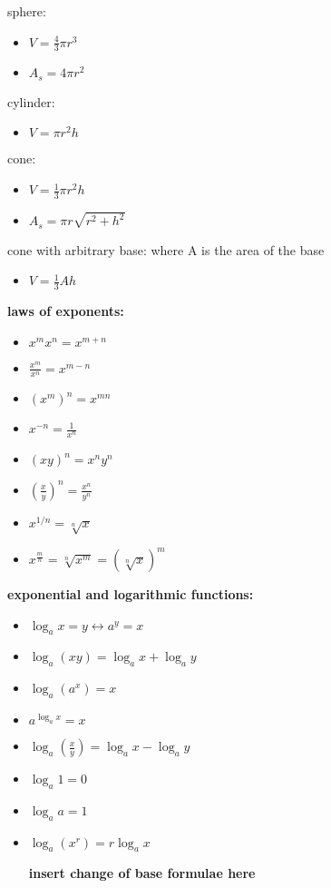 \documentclass{article}
\begin{document}
	sphere:
		\begin{itemize}
			\item $V = \frac{4}{3}\pi r^3$
			\item $A_s = 4\pi r^2$
		\end{itemize}

	cylinder:
		\begin{itemize}
			\item $V = \pi r^2h$
		\end{itemize}

	cone:
		\begin{itemize}
			\item $V = \frac{1}{3}\pi r^2h$
			\item $A_s = \pi r\sqrt{r^2+h^2}$
		\end{itemize}

	cone with arbitrary base: where A is the area of the base
		\begin{itemize}
			\item $V = \frac{1}{3}Ah$
		\end{itemize}

\textbf{laws of exponents:} 
	\begin{itemize}
		\item $x^mx^n = x^{m+n}$
		\item $\frac{x^m}{x^n} = x^{m-n}$
		\item $(x^m)^n = x^{mn}$
		\item $x^{-n} = \frac{1}{x^n}$
		\item $(xy)^n = x^ny^n$
		\item $(\frac{x}{y})^n = \frac{x^n}{y^n}$ \item $x^{1/n} = \sqrt[n]{x}$
		\item $x^{\frac{m}{n}} = \sqrt[n]{x^m} = (\sqrt[n]{x})^m$
	\end{itemize}

\textbf{exponential and logarithmic functions:}
	\begin{itemize}
		\item $\log_ax = y \leftrightarrow a^y = x$
		\item $\log_a(xy) = \log_ax + \log_ay$
		\item $\log_a(a^x) = x$
		\item $a^{\log_a x} = x$
		\item $\log_a(\frac{x}{y}) = \log_ax - \log_ay$
		\item $\log_a1 = 0$
		\item $\log_aa = 1$
		\item $\log_a(x^r) = r\log_ax$


			\textbf{insert change of base formulae here}
	\end{itemize}
\end{document}
